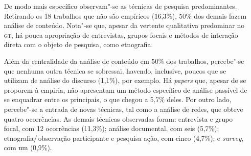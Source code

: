 {

De modo mais específico observam"-se as técnicas de pesquisa
predominantes. Retirando os 18 trabalhos que não são empíricos (16,3\%),
50\% dos demais fazem análise de conteúdo. Nota"-se que, apesar da
vertente qualitativa predominar no \textsc{gt}, há pouca apropriação de
entrevistas, grupos focais e métodos de interação direta com o objeto de
pesquisa, como etnografia.

Além da centralidade da análise de conteúdo em 50\% dos trabalhos,
percebe"-se que nenhuma outra técnica se sobressai, havendo, inclusive,
poucos que se utilizam de análise do discurso (1,1\%), por exemplo. Há
\textit{papers} que, apesar de se proporem à empiria, não apresentam um
método específico de análise passível de se enquadrar entre os
principais, o que chegou a 5,7\% deles. Por outro lado, percebe"-se a
entrada de novas técnicas, tal como a análise de redes, que obteve
quatro ocorrências. As demais técnicas observadas foram: entrevista e grupo focal, com 12 ocorrências (11,3\%); análise documental, com seis (5,7\%); etnografia/\,observação
participante e pesquisa ação, com cinco (4,7\%); e \textit{survey}, com um (0,9\%).

}
